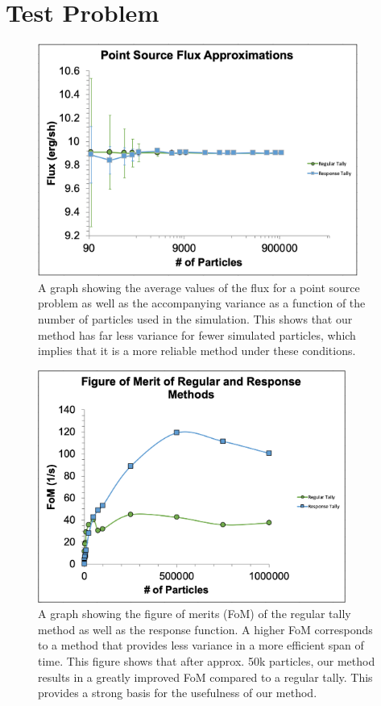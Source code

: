\documentclass[]{article}
\begin{document}
\section{Test Problem}
	\begin{figure} [h!]
		\centering
		\includegraphics[height=3in]{Figures/point_src_errors.png}
		\caption{A graph showing the average values of the flux for a point source problem as well as the accompanying variance as a function of the number of particles used in the simulation. This shows that our method has far less variance for fewer simulated particles, which implies that it is a more reliable method under these conditions.}
		\label{fig:point_source_errors}
	\end{figure}

	\begin{figure} [h!]
		\centering
		\includegraphics[height=3in]{Figures/point_src_fom.png}
		\caption{A graph showing the figure of merits (FoM) of the regular tally method as well as the response function. A higher FoM corresponds to a method that provides less variance in a more efficient span of time. This figure shows that after approx. 50k particles, our method results in a greatly improved FoM compared to a regular tally. This provides a strong basis for the usefulness of our method.
}
		\label{fig:point_source_FoM}
	\end{figure}
\end{document}

